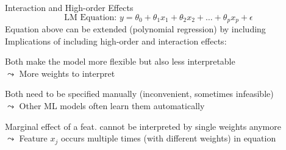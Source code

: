 \documentclass[10pt,compress,t,notes=noshow, xcolor=table]{beamer}
\begin{document}


\begin{framev}[align=top]{Interaction and High-order Effects}
$$\text{LM Equation: } y = \theta_0 + \theta_1 x_1 + \theta_2 x_2 + \dots + \theta_p x_p + \epsilon$$
Equation above can be extended (polynomial regression) by including
\pause\\
\spacer[0.25]
Implications of including high-order and interaction effects:
\begin{itemizeM}
\item Both make the model more flexible but also less interpretable\\
$\leadsto$ More weights to interpret
\item Both need to be specified manually (inconvenient, sometimes infeasible)\\
$\leadsto$ Other ML models often learn them automatically
\item Marginal effect of a feat. cannot be interpreted by single weights anymore\\
$\leadsto$ Feature $x_j$ occurs multiple times (with different weights) in equation
\end{itemizeM}


\end{framev}
\end{document}
